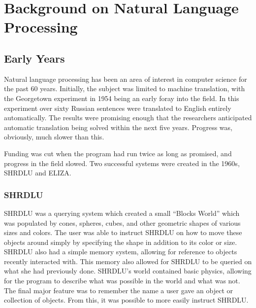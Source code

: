 \chapter{Background on Natural Language Processing}\label{text}                                                                   
\section{Early Years}

Natural language processing has been an area of interest in computer science for the past 60 years. Initially, the subject was limited to machine translation, with the Georgetown experiment in 1954 being an early foray into the field. In this experiment over sixty Russian sentences were translated to English entirely automatically. The results were promising enough that the researchers anticipated automatic translation being solved within the next five years. \cite{Hutchins} Progress was, obviously, much slower than this.             

 
Funding was cut when the program had run twice as long as promised, and progress in the field slowed. Two successful systems were created in the 1960s, SHRDLU and ELIZA.
                                                                                          
\subsection{SHRDLU}                                                                    
SHRDLU was a querying system which created a small ``Blocks World'' which was populated by cones, spheres, cubes, and other geometric shapes of various sizes and colors. \cite{winograd} The user was able to instruct SHRDLU on how to move these objects around simply by specifying the shape in addition to its color or size. SHRDLU also had a simple memory system, allowing for reference to objects recently interacted with. This memory also allowed for SHRDLU to be queried on what she had previously done. SHRDLU's world contained basic physics, allowing for the program to describe what was possible in the world and what was not. The final major feature was to remember the name a user gave an object or collection of objects. From this, it was possible to more easily instruct SHRDLU.                      
                                                                                          
